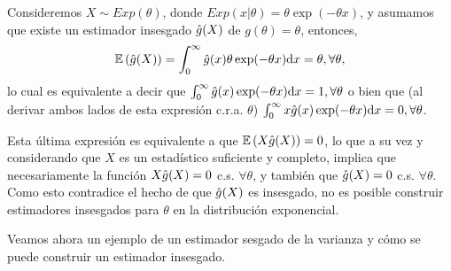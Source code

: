 \begin{example}
	\label{ex:estimador_exponancial}
	Consideremos $X\sim Exp(\theta)$, donde $Exp(x|\theta) = \theta\exp(-\theta x)$, y asumamos que existe un estimador insesgado ${ \hat{g}(X)}$ de $g(\theta) = \theta$, entonces, 
	\begin{equation}
		\mathbb{E} \left({ \hat{g}(X)}\right) = \int_0^\infty { \hat{g}(x)}\theta\exp(-\theta x){\text{d}} x = \theta, \forall \theta,
	\end{equation}
	lo cual es equivalente a decir que $\int_0^\infty { \hat{g}(x)}\exp(-\theta x){\text{d}} x = 1, \forall \theta$ o bien que (al derivar ambos lados de esta expresión c.r.a. $\theta$)  $\int_0^\infty x{ \hat{g}(x)}\exp(-\theta x){\text{d}} x = 0, \forall \theta$.

	Esta última expresión es equivalente a que $\mathbb{E} \left(X{ \hat{g}(X)}\right) = 0$, lo que a su vez y considerando que $X$ es un estadístico suficiente y completo, implica que necesariamente la función $X{ \hat{g}(X)}=0$ c.s. $\forall \theta$, y también que ${ \hat{g}(X)}=0$ c.s. $\forall \theta$. Como esto contradice el hecho de que ${ \hat{g}(X)}$ es insesgado, no es posible construir estimadores insesgados para $\theta$ en la distribución exponencial.
\end{example}


Veamos ahora un ejemplo de un estimador sesgado de la varianza y cómo se puede construir un estimador insesgado. 

